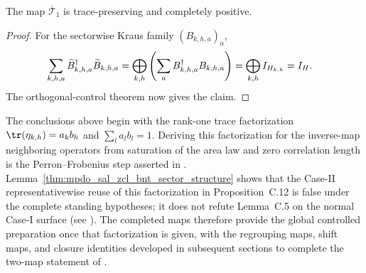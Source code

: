 \begin{lemma}
    \label{thm:mpdo_completed_omega_controlled_map_cptp}
    \leanok
    The map $\overline{\mathcal T}_1$ is trace-preserving and completely
    positive.
\end{lemma}
\begin{proof}
    \leanok
    For the sectorwise Kraus family $(B_{k,h,a})_a$,
    \begin{align}
        \sum_{k,h,a}\widetilde B_{k,h,a}^{\dagger}\widetilde B_{k,h,a}
         & =\bigoplus_{k,h}\left(\sum_a B_{k,h,a}^{\dagger}B_{k,h,a}\right)
        =\bigoplus_{k,h}I_{H_{k,h}}=I_H. \notag
    \end{align}
    The orthogonal-control theorem now gives the claim.
\end{proof}

\begin{remark}
    The conclusions above begin with the rank-one trace factorization
    $\tr(\eta_{k,h})=a_kb_h$ and $\sum_l a_lb_l=1$. Deriving this
    factorization for the inverse-map neighboring operators from saturation
    of the area law and zero correlation length is the Perron--Frobenius step
    asserted in
    \cite[Appendix~C.2, lines~1404--1410 and~1484--1498]
    {Cirac2016MPDO_arXiv}. Lemma~\ref{thm:mpdo_sal_zcl_bnt_sector_structure}
    shows that the Case-II representativewise reuse of this factorization in
    Proposition~C.12 is false under the complete standing hypotheses; it does
    not refute Lemma~C.5 on the normal Case-I surface (see
    \cite{gap:cpgsv17_pf_rank_one}).
    The completed maps therefore provide the global controlled preparation once
    that factorization is given, with the regrouping maps, shift maps,
    and closure identities developed in subsequent sections to complete the
    two-map statement of
    \cite[Appendix~C.2, lines~1510--1517]{Cirac2016MPDO_arXiv}.
\end{remark}
